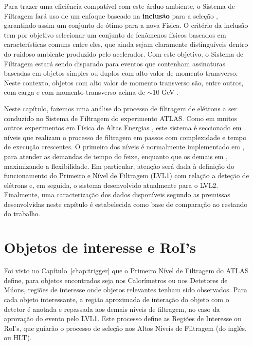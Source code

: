 Para trazer uma eficiência compatível com este árduo ambiente, o Sistema de
Filtragem fará uso de um enfoque baseado na \textbf{inclusão} para a seleção
, garantindo assim um conjunto de  ótimo para a nova
Física. O critério da inclusão tem por objetivo selecionar um conjunto de
fenômenos físicos baseados em características comuns entre eles, que ainda
sejam claramente distinguíveis dentro do ruidoso ambiente produzido pelo
acelerador. Com este objetivo, o Sistema de Filtragem estará sendo disparado
para eventos que contenham assinaturas baseadas em objetos simples ou duplos
com alto valor de momento transverso. Neste contexto, objetos com alto valor
de momento transverso são, entre outros,  com carga e com momento
transverso acima de $\sim$10 GeV \cite{hlt-tdr}.

Neste capítulo, fazemos uma análise do processo de filtragem de elétrons a ser
conduzido no Sistema de Filtragem do experimento ATLAS. Como em muitos outros
experimentos em Física de Altas Energias \cite{abolins-calor-2000,
monteiro-calor-1999}, este sistema é seccionado em níveis que realizam o
processo de filtragem em passos com complexidade e tempo de execução
crescentes. O primeiro dos níveis é normalmente implementado em
, para atender as demandas de tempo do feixe, enquanto que os
demais em , maximizando a flexibilidade. Em particular, atenção
será dada à definição do funcionamento do Primeiro e Nível de Filtragem (LVL1)
com relação a deteção de elétrons e, em seguida, o sistema desenvolvido
atualmente para o LVL2. Finalmente, uma caracterização dos dados disponíveis
segundo as premissas desenvolvidas neste capítulo é estabelecida como base de
comparação ao restando do trabalho.

\section{Objetos de interesse e RoI's}

Foi visto no Capítulo~\ref{chap:trigger} que o Primeiro Nível de Filtragem do
ATLAS define, para objetos encontrados seja nos Calorímetros ou nos Detetores
de Múons, regiões de interesse onde objetos relevantes tenham sido
observados. Para cada objeto interessante, a região aproximada de interação do
objeto com o detetor é anotada e repassada aos demais níveis de filtragem, no
caso da aprovação do evento pelo LVL1. Este processo define as Regiões de
Interesse ou RoI's, que guiarão o processo de seleção nos Altos Níveis de
Filtragem (do inglês,  ou HLT).

